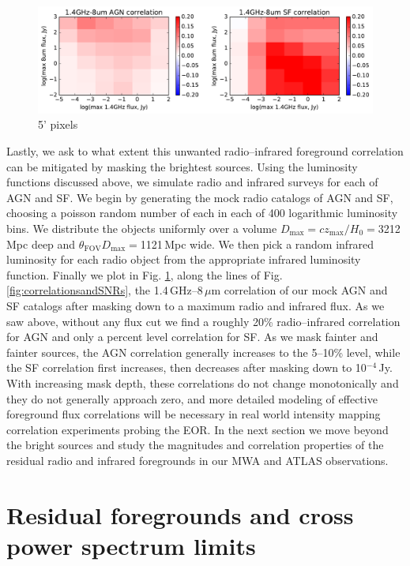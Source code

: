 \documentclass{emulateapj}
\newcommand{\maxtext}{\text{max}}
\begin{document}
\begin{figure}[h]
\centering
\includegraphics[width=6in]{images/sim_correlation_agn_and_sf.pdf}
\caption{5' pixels}
\label{fig:simagnlfcorrelations}
\end{figure}

Lastly, we ask to what extent this unwanted radio--infrared foreground correlation can be mitigated by masking the brightest sources. Using the luminosity functions discussed above, we simulate radio and infrared surveys for each of AGN and SF. We begin by generating the mock radio catalogs of AGN and SF, choosing a poisson random number of each in each of 400 logarithmic luminosity bins. We distribute the objects uniformly over a volume $D_\maxtext=cz_\maxtext/H_0=$3212\,Mpc deep and $\theta_{\text{FOV}}D_\maxtext=$1121\,Mpc wide. We then pick a random infrared luminosity for each radio object from the appropriate infrared luminosity function. Finally we plot in Fig. \ref{fig:simagnlfcorrelations}, along the lines of Fig. \ref{fig:correlationsandSNRs}, the 1.4\,GHz--8\,$\mu$m correlation of our mock AGN and SF catalogs after masking down to a maximum radio and infrared flux. As we saw above, without any flux cut we find a roughly 20\% radio--infrared correlation for AGN and only a percent level correlation for SF. As we mask fainter and fainter sources, the AGN correlation generally increases to the 5--10\% level, while the SF correlation first increases, then decreases after masking down to 10$^{-4}$\,Jy. With increasing mask depth, these correlations do not change monotonically and they do not generally approach zero, and more detailed modeling of effective foreground flux correlations will be necessary in real world intensity mapping correlation experiments probing the EOR. In the next section we move beyond the bright sources and study the magnitudes and correlation properties of the residual radio and infrared foregrounds in our MWA and ATLAS observations.

\section{Residual foregrounds and cross power spectrum limits}
\end{document}
